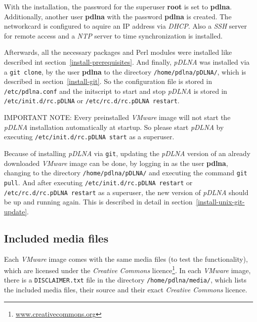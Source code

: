 \documentclass[a4paper,oneside,10pt]{report}
\newenvironment{colframeimportantnote}{%
  \begin{Sbox}
    \begin{minipage}{.99\columnwidth}
}{%
  \end{minipage}
  \end{Sbox}
  \begin{center}
    \fcolorbox{black}{Orange}{\TheSbox}
  \end{center}
}
\begin{document}
With the installation, the password for the superuser \textbf{root} is set to \textbf{pdlna}. Additionally, another user \textbf{pdlna} with the password \textbf{pdlna} is created. The networkcard is configured to aquire an IP address via {\em DHCP}. Also a {\em SSH} server for remote access and a {\em NTP} server to time synchronization is installed.

Afterwards, all the necessary packages and Perl modules were installed like described int section~\ref{install-prerequisites}. And finally, {\em pDLNA} was installed via a \verb|git clone|, by the user \textbf{pdlna} to the directory \verb|/home/pdlna/pDLNA/|, which is described in section~\ref{install-git}. So the configuration file is stored in \verb|/etc/pdlna.conf| and the initscript to start and stop {\em pDLNA} is stored in \verb|/etc/init.d/rc.pDLNA| or \verb|/etc/rc.d/rc.pDLNA restart|.

\begin{colframeimportantnote}
\textsc{IMPORTANT NOTE:} Every preinstalled {\em VMware} image will not start the {\em pDLNA} installation automatically at startup. So please start {\em pDLNA} by executing \verb|/etc/init.d/rc.pDLNA start| as a superuser.
\end{colframeimportantnote}

Because of installing {\em pDLNA} via \verb|git|, updating the {\em pDLNA} version of an already downloaded {\em VMware} image can be done, by logging in as the user \textbf{pdlna}, changing to the directory \verb|/home/pdlna/pDLNA/| and executing the command \verb|git pull|. And after executing \verb|/etc/init.d/rc.pDLNA restart| or \verb|/etc/rc.d/rc.pDLNA restart| as a superuser, the new version of {\em pDLNA} should be up and running again. This is described in detail in section~\ref{install-unix-git-update}.

\subsection{Included media files}

Each {\em VMware} image comes with the same media files (to test the functionality), which are licensed under the {\em Creative Commons} licence\footnote{\url{www.creativecommons.org}}. In each {\em VMware} image, there is a \verb|DISCLAIMER.txt| file in the directory \verb|/home/pdlna/media/|, which lists the included media files, their source and their exact {\em Creative Commons} licence.
\end{document}
